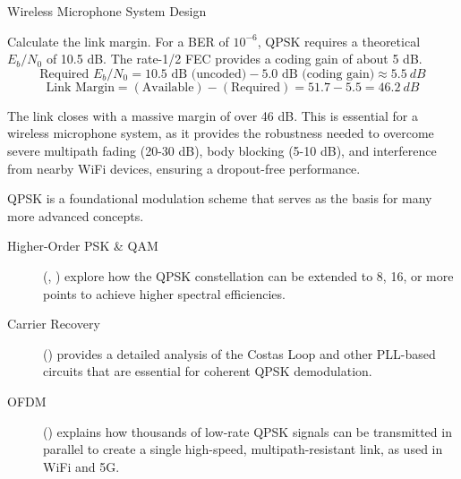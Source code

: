 \begin{workedexample}{Wireless Microphone System Design}
\begin{derivationsteps}
        \step Calculate the link margin. For a BER of $10^{-6}$, QPSK requires a theoretical $E_b/N_0$ of 10.5 dB. The rate-1/2 FEC provides a coding gain of about 5 dB.
        \[ \text{Required } E_b/N_0 = 10.5 \text{ dB (uncoded)} - 5.0 \text{ dB (coding gain)} \approx \qty{5.5}{dB} \]
        \[ \text{Link Margin} = (\text{Available}) - (\text{Required}) = 51.7 - 5.5 = \qty{46.2}{dB} \]
    \end{derivationsteps}
    
     The link closes with a massive margin of over 46 dB. This is essential for a wireless microphone system, as it provides the robustness needed to overcome severe multipath fading (20-30 dB), body blocking (5-10 dB), and interference from nearby WiFi devices, ensuring a dropout-free performance.
\end{workedexample}


\begin{importantbox}[title={Further Reading}]
    QPSK is a foundational modulation scheme that serves as the basis for many more advanced concepts.
    \begin{description}
        \item[Higher-Order PSK & QAM] (, ) explore how the QPSK constellation can be extended to 8, 16, or more points to achieve higher spectral efficiencies.
        \item[Carrier Recovery] () provides a detailed analysis of the Costas Loop and other PLL-based circuits that are essential for coherent QPSK demodulation.
        \item[OFDM] () explains how thousands of low-rate QPSK signals can be transmitted in parallel to create a single high-speed, multipath-resistant link, as used in WiFi and 5G.
    \end{description}
\end{importantbox}